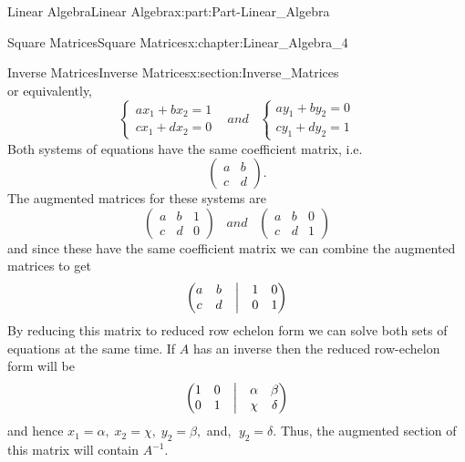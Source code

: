 \documentclass[oneside,10pt,]{book}
\numberwithin{equation}{section}
\newcommand{\amp}{&}
\begin{document}
\begin{partptx}{Linear Algebra}{}{Linear Algebra}{}{}{x:part:Part-Linear_Algebra}
\begin{chapterptx}{Square Matrices}{}{Square Matrices}{}{}{x:chapter:Linear_Algebra_4}
\begin{sectionptx}{Inverse Matrices}{}{Inverse Matrices}{}{}{x:section:Inverse_Matrices}
\begin{equation*}
\end{equation*}
or equivalently,%
\begin{equation*}
\begin{cases}
ax_{1} + bx_{2} = 1\\
cx_{1} + dx_{2} = 0
\end{cases}
\;\;\; and \;\;\; 
\begin{cases}
ay_{1} + by_{2} = 0\\
cy_{1} + dy_{2} = 1
\end{cases}
\end{equation*}
Both systems of equations have the same coefficient matrix, i.e.%
\begin{equation*}
\begin{pmatrix} a \amp b \\ c \amp d \end{pmatrix}.
\end{equation*}
The augmented matrices for these systems are%
\begin{equation*}
\begin{pmatrix} a \amp b \amp 1 \\ c \amp d \amp 0 \end{pmatrix}
\;\;\; and \;\;\; 
\begin{pmatrix} a \amp b \amp 0 \\ c \amp d \amp 1 \end{pmatrix}
\end{equation*}
and since these have the same coefficient matrix we can combine the augmented matrices to get%
\begin{equation*}
\begin{pmatrix}
a \amp b \amp \bigm |  \amp  1 \amp 0 \\
c \amp d \amp \bigm | \amp 0 \amp 1
\end{pmatrix}
\end{equation*}
By reducing this matrix to reduced row echelon form we can solve both sets of equations at the same time. If \(A \) has an inverse then the reduced row-echelon form will be%
\begin{equation*}
\begin{pmatrix}
1 \amp 0 \amp \bigm |  \amp  \alpha \amp \beta \\
0 \amp 1 \amp \bigm | \amp \chi \amp \delta
\end{pmatrix}
\end{equation*}
and hence \(x_{1}=\alpha,\; x_{2}=\chi,\; y_{2}=\beta, \) and, \(\; y_{2}=\delta  \). Thus, the augmented section of this matrix will contain  \(A^{-1} \).%

\end{sectionptx}
\end{chapterptx}
\end{partptx}
\end{document}
